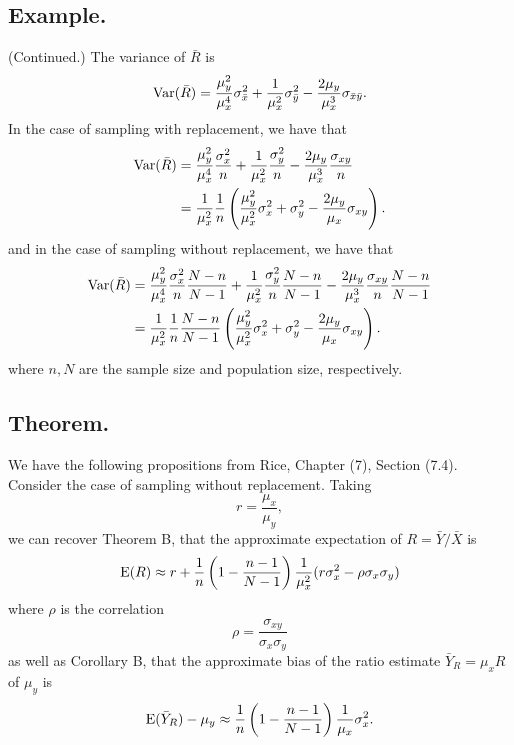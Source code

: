 \documentclass[titlepage]{article}
\begin{document}
\subsection{Example.} (Continued.) The variance of $\bar{R}$ is 
$$\text{Var}(\bar{R}) = \frac{\mu_{y}^{2}}{\mu_{x}^{4}}\sigma_{\bar{x}}^{2} + \frac{1}{\mu_{x}^{2}}\sigma_{\bar{y}}^{2} - \frac{2\mu_{y}}{\mu_{x}^{3}}\sigma_{\bar{x}\bar{y}}.$$
In the case of sampling with replacement, we have that 
\begin{align*}
    \text{Var}(\bar{R}) &= \frac{\mu_{y}^{2}}{\mu_{x}^{4}}\frac{\sigma_{x}^{2}}{n} + \frac{1}{\mu_{x}^{2}}\frac{\sigma_{y}^{2}}{n} - \frac{2\mu_{y}}{\mu_{x}^{3}}\frac{\sigma_{xy}}{n} \\
            &= \frac{1}{\mu_{x}^{2}}\frac{1}{n}\left(\frac{\mu_{y}^{2}}{\mu_{x}^{2}}\sigma_{x}^{2} + \sigma_{y}^{2} 
               - \frac{2\mu_{y}}{\mu_{x}}\sigma_{xy}\right).
\end{align*}
and in the case of sampling without replacement, we have that 
\begin{align*}
    \text{Var}(\bar{R}) &= \frac{\mu_{y}^{2}}{\mu_{x}^{4}}\frac{\sigma_{x}^{2}}{n}\frac{N - n}{N - 1} + \frac{1}{\mu_{x}^{2}}\frac{\sigma_{y}^{2}}{n}\frac{N - n}{N - 1} - \frac{2\mu_{y}}{\mu_{x}^{3}}\frac{\sigma_{xy}}{n}\frac{N - n}{N - 1} \\
            &= \frac{1}{\mu_{x}^{2}}\frac{1}{n}\frac{N-n}{N-1}\left(\frac{\mu_{y}^{2}}{\mu_{x}^{2}}\sigma_{x}^{2} + \sigma_{y}^{2} - \frac{2\mu_{y}}{\mu_{x}}\sigma_{xy}\right).
\end{align*}
where $n, N$ are the sample size and population size, respectively.

\subsection{Theorem.} We have the following propositions from Rice, Chapter (7), Section (7.4). Consider the case of sampling without replacement. Taking 
$$r = \frac{\mu_{x}}{\mu_{y}},$$
we can recover Theorem B, that the approximate expectation of $R = \bar{Y}/\bar{X}$ is 
$$\text{E}(R) \approx r + \frac{1}{n}\left(1 - \frac{n-1}{N-1}\right)\frac{1}{\mu_{x}^{2}}
(r\sigma_{x}^{2} - \rho\sigma_{x}\sigma_{y})$$
where $\rho$ is the correlation 
$$\rho = \frac{\sigma_{xy}}{\sigma_{x}\sigma_{y}}$$
as well as Corollary B, that the approximate bias of the ratio estimate $\bar{Y}_{R} = \mu_{x}R$ of $\mu_{y}$ is 
$$\text{E}(\bar{Y}_{R}) - \mu_{y} \approx \frac{1}{n}\left(1 - \frac{n-1}{N-1}\right)\frac{1}{\mu_{x}}\sigma_{x}^{2}.$$
\end{document}
